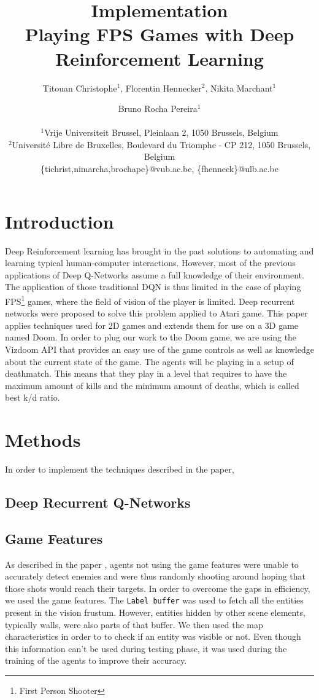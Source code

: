 \documentclass[letterpaper]{article}
\title{Implementation\\Playing FPS Games with Deep Reinforcement Learning}
\author{Titouan Christophe$^{1}$, Florentin Hennecker$^{2}$, Nikita Marchant$^{1}$ \and Bruno Rocha Pereira$^{1}$ \\
\mbox{}\\
$^1$Vrije Universiteit Brussel, Pleinlaan 2, 1050 Brussels, Belgium \\
$^2$Universit\'e Libre de Bruxelles, Boulevard du Triomphe - CP 212, 1050
Brussels, Belgium \\
\{tichrist,nimarcha,brochape\}@vub.ac.be, \{fhenneck\}@ulb.ac.be}
\begin{document}
\maketitle
\begin{abstract}
\end{abstract}

\section{Introduction}
Deep Reinforcement learning has brought in the past solutions to automating and learning typical human-computer interactions. 
However, most of the previous applications of Deep Q-Networks assume a full knowledge of their environment. The application of those traditional DQN is thus limited in the case of playing FPS\footnote{First Person Shooter} games, where the field of vision of the player is limited. Deep recurrent networks were proposed to solve this problem \citep{hausknecht2015deep} applied to Atari game. This paper applies techniques used for 2D games and extends them for use on a 3D game named Doom.
In order to plug our work to the Doom game, we are using the Vizdoom API \citep{Kempka2016ViZDoom} that provides an easy use of the game controls as well as knowledge about the current state of the game.
The agents will be playing in a setup of deathmatch. This means that they play in a level that requires to have the maximum amount of kills and the minimum amount of deaths, which is called best k/d ratio.
\section{Methods}
In order to implement the techniques described in the paper,\todo{}

\subsection{Deep Recurrent Q-Networks}

\subsection{Game Features}
As described in the paper \citep{Lample2016}, agents not using the game features were unable to accurately detect enemies and were thus randomly shooting around hoping that those shots would reach their targets. In order to overcome the gaps in efficiency, we used the game features. The \texttt{Label buffer} was used to fetch all the entities present in the vision frustum. However, entities hidden by other scene elements, typically walls, were also parts of that buffer. We then used the map characteristics in order to to check if an entity was visible or not. Even though this information can't be used during testing phase, it was used during the training of the agents to improve their accuracy.
\end{document}
